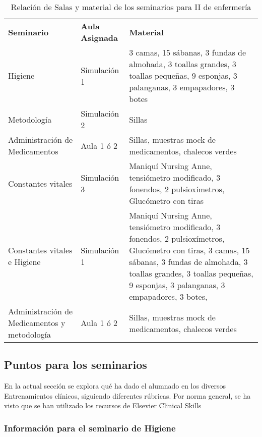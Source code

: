 \begin{table}[H]
\centering
\begin{tabular}{N{0.2\textwidth}N{0.12\textwidth}M{0.6\textwidth}}
{\color[HTML]{FFFFFF} \textbf{Seminario}} &
  {\color[HTML]{FFFFFF} \textbf{Aula Asignada}} &
  {\color[HTML]{FFFFFF} \textbf{Material}} \\
Higiene &
  Simulación 1 &
  3 camas, 15 sábanas, 3 fundas de almohada, 3 toallas grandes, 3 toallas pequeñas, 9 esponjas, 3 palanganas, 3 empapadores, 3 botes \\
Metodología &
  Simulación 2 &
  Sillas \\
Administración de Medicamentos &
  Aula 1 ó 2 &
  Sillas, muestras mock de medicamentos, chalecos verdes \\
Constantes vitales &
  Simulación 3 &
  Maniquí Nursing Anne, tensiómetro modificado, 3 fonendos, 2 pulsioxímetros, Glucómetro con tiras \\ \hline
Constantes vitales e Higiene &
  Simulación 1 &
  Maniquí Nursing Anne, tensiómetro modificado, 3 fonendos, 2 pulsioxímetros, Glucómetro con tiras, 3 camas, 15 sábanas, 3 fundas de almohada, 3 toallas grandes, 3 toallas pequeñas, 9 esponjas, 3 palanganas, 3 empapadores, 3 botes, \\
Administración de Medicamentos y metodología &
  Aula 1 ó 2 &
  Sillas, muestras mock de medicamentos, chalecos verdes
\end{tabular}
\caption{Relación de Salas y material de los seminarios para II de enfermería}
\label{tab:PlanXVIII:SalasEstaciones}
\end{table}
\subsection{Puntos para los seminarios}
En la actual sección se explora qué ha dado el alumnado en los diversos Entrenamientos clínicos, siguiendo diferentes rúbricas. Por norma general, se ha visto que se han utilizado los recursos de Elsevier Clinical Skills
\subsubsection{Información para el seminario de Higiene}



